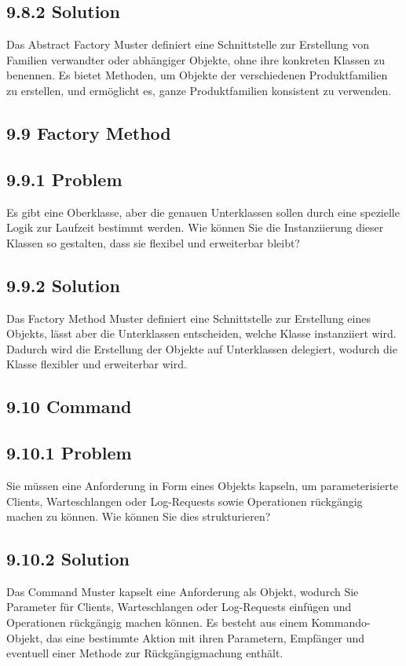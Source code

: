 \subsection*{9.8.2 Solution}
Das Abstract Factory Muster definiert eine Schnittstelle zur Erstellung von Familien verwandter oder abhängiger Objekte, ohne ihre konkreten Klassen zu benennen. Es bietet Methoden, um Objekte der verschiedenen Produktfamilien\\
zu erstellen, und ermöglicht es, ganze Produktfamilien konsistent zu verwenden.

\subsection*{9.9 Factory Method}
\subsection*{9.9.1 Problem}
Es gibt eine Oberklasse, aber die genauen Unterklassen sollen durch eine spezielle Logik zur Laufzeit bestimmt werden. Wie können Sie die Instanziierung dieser Klassen so gestalten, dass sie flexibel und erweiterbar bleibt?

\subsection*{9.9.2 Solution}
Das Factory Method Muster definiert eine Schnittstelle zur Erstellung eines Objekts, lässt aber die Unterklassen entscheiden, welche Klasse instanziiert wird. Dadurch wird die Erstellung der Objekte auf Unterklassen delegiert, wodurch die Klasse flexibler und erweiterbar wird.

\subsection*{9.10 Command}
\subsection*{9.10.1 Problem}
Sie müssen eine Anforderung in Form eines Objekts kapseln, um parameterisierte Clients, Warteschlangen oder Log-Requests sowie Operationen rückgängig machen zu können. Wie können Sie dies strukturieren?

\subsection*{9.10.2 Solution}
Das Command Muster kapselt eine Anforderung als Objekt, wodurch Sie Parameter für Clients, Warteschlangen oder Log-Requests einfügen und Operationen rückgängig machen können. Es besteht aus einem Kommando-Objekt, das eine bestimmte Aktion mit ihren Parametern, Empfänger und eventuell einer Methode zur Rückgängigmachung enthält.


